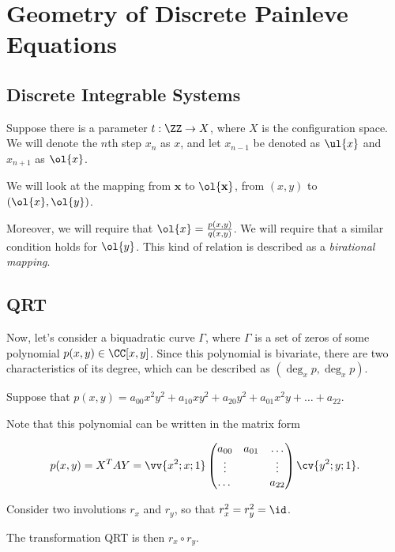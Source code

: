 \documentclass[11pt]{scrartcl}
\begin{document}
  \section{Geometry of Discrete Painleve Equations}

  \subsection{Discrete Integrable Systems}

  Suppose there is a parameter $t:\ZZ \to X$, where $X$ is the
  configuration space. We will denote the $n$th step $x_{n}$ as $x$,
  and let $x_{n-1}$ be denoted as $\ul{x}$ and $x_{n+1}$ as $\ol{x}$.

  We will look at the mapping from $\mathbf{x}$ to $\mathbf{\ol{x}}$, from $(x, y)$ to $(\ol{x}, \ol{y})$.

  Moreover, we will require that $\ol{x} = \frac{p(x, y)}{q(x,y)}$. We
  will require that a similar condition holds for $\ol{y}$. This kind
  of relation is described as a \textit{birational mapping}.

  \subsection{QRT}
  
  Now, let's consider a biquadratic curve $\Gamma$, where $\Gamma$ is
  a set of zeros of some polynomial $p(x, y) \in \CC[x, y]$. Since
  this polynomial is bivariate, there are two characteristics of its
  degree, which can be described as $(\deg_{x} p, \deg_{x} p)$.

  Suppose that
  $p(x, y) = a_{00}x^{2}y^{2} + a_{10}xy^{2} + a_{20} y^{2} +
  a_{01}x^{2}y + \dots + a_{22}$.

  Note that this polynomial can be written in the matrix form%
  
  \begin{equation}
    p(x, y) = X^{T}AY = \vv{x^{2}; x; 1} \begin{pmatrix}
      a_{00} & a_{01} & \dots\\
      \vdots & & \vdots\\
      \dots & & a_{22}
    \end{pmatrix} \cv{y^{2}; y; 1}.
  \end{equation}

  Consider two involutions $r_{x}$ and $r_{y}$, so that
  $r_{x}^{2} = r_{y}^{2} = \id$.

  The transformation QRT is then $r_{x} \circ r_{y}$.
\end{document}
